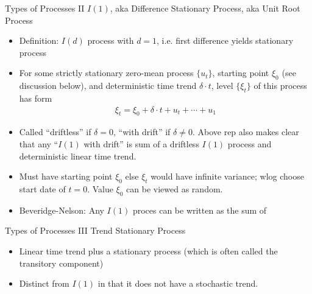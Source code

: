 \documentclass[aspectratio=169, handout]{beamer}
\begin{document}
{\scriptsize
\begin{frame}{Types of Processes II}
$I(1)$, aka Difference Stationary Process, aka Unit Root Process
\begin{itemize}
  \item \alert{Definition}: $I(d)$ process with $d=1$, i.e. first
    difference yields stationary process
  \item
    For some strictly stationary zero-mean process $\{u_t\}$,
    starting point $\xi_0$ (see discussion below), and deterministic
    time trend $\delta\cdot t$,
    level $\{\xi_t\}$ of this process has form
    \begin{align*}
      \xi_t = \xi_0 + \delta \cdot t + u_t + \cdots + u_1
    \end{align*}

  \item Called ``driftless'' if $\delta=0$, ``with drift'' if
    $\delta\neq0$.
    Above rep also makes clear that any ``$I(1)$ with drift'' is sum of
    a driftless $I(1)$ process and deterministic linear time trend.

  \item Must have starting point $\xi_0$ else $\xi_t$ would have
    infinite variance; wlog choose start date of $t=0$.
    Value $\xi_0$ can be viewed as random.

  \item Beveridge-Nelson:
    Any $I(1)$ proces can be written as the sum of

\end{itemize}
\end{frame}
}


{\footnotesize
\begin{frame}{Types of Processes III}
Trend Stationary Process
\begin{itemize}
  \item Linear time trend plus a stationary process (which is often
    called the \alert{transitory component})
  \item Distinct from $I(1)$ in that it does not have a stochastic
    trend.
\end{itemize}
\end{frame}
}
\end{document}
